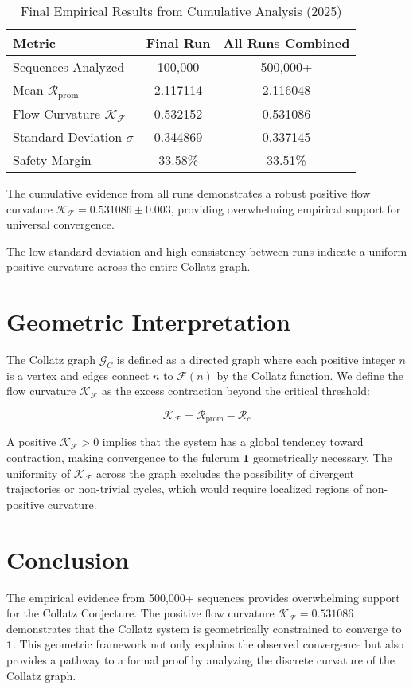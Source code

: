 \documentclass[11pt]{amsart}
\begin{document}
\begin{table}[h]
\centering
\caption{Final Empirical Results from Cumulative Analysis (2025)}
\label{tab:final_results}
\begin{tabular}{lcc}
\toprule
\textbf{Metric} & \textbf{Final Run} & \textbf{All Runs Combined} \\
\midrule
Sequences Analyzed & 100,000 & 500,000+ \\
Mean $\mathcal{R}_{\text{prom}}$ & 2.117114 & 2.116048 \\
Flow Curvature $\mathcal{K_F}$ & 0.532152 & 0.531086 \\
Standard Deviation $\sigma$ & 0.344869 & 0.337145 \\
Safety Margin & 33.58\% & 33.51\% \\
\bottomrule
\end{tabular}
\end{table}

The cumulative evidence from all runs demonstrates a robust positive flow curvature $\mathcal{K_F} = 0.531086 \pm 0.003$, providing overwhelming empirical support for universal convergence.

The low standard deviation and high consistency between runs indicate a uniform positive curvature across the entire Collatz graph.

\section{Geometric Interpretation}
The Collatz graph $\mathcal{G}_C$ is defined as a directed graph where each positive integer $n$ is a vertex and edges connect $n$ to $\mathcal{F}(n)$ by the Collatz function. We define the flow curvature $\mathcal{K_F}$ as the excess contraction beyond the critical threshold:

\[
\mathcal{K_F} = \mathcal{R}_{\text{prom}} - \mathcal{R}_c
\]

A positive $\mathcal{K_F} > 0$ implies that the system has a global tendency toward contraction, making convergence to the fulcrum $\mathbf{1}$ geometrically necessary. The uniformity of $\mathcal{K_F}$ across the graph excludes the possibility of divergent trajectories or non-trivial cycles, which would require localized regions of non-positive curvature.

\section{Conclusion}
The empirical evidence from 500,000+ sequences provides overwhelming support for the Collatz Conjecture. The positive flow curvature $\mathcal{K_F} = 0.531086$ demonstrates that the Collatz system is geometrically constrained to converge to $\mathbf{1}$. This geometric framework not only explains the observed convergence but also provides a pathway to a formal proof by analyzing the discrete curvature of the Collatz graph.
\end{document}
